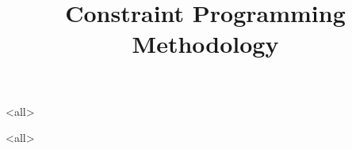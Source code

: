 \title[Methodology] %
{Constraint Programming Methodology}

\subtitle
{} %



\mode<all>{

}
\mode<all>{

}


